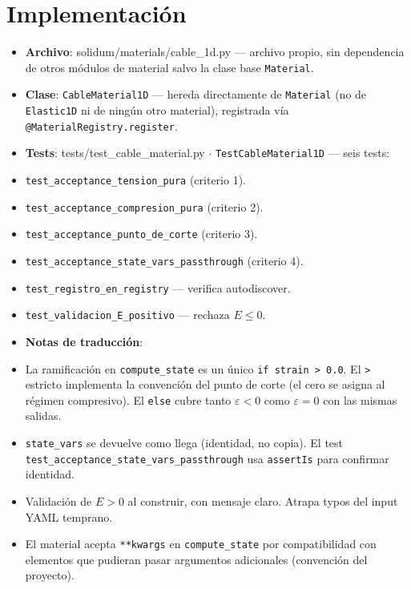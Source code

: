 \documentclass[11pt,letterpaper,oneside]{report}
\begin{document}
\section{Implementación}

\begin{itemize}
  \item \textbf{Archivo}: solidum/materials/cable\_1d.py --- archivo propio, sin dependencia de otros módulos de material salvo la clase base \texttt{Material}.
  \item \textbf{Clase}: \texttt{CableMaterial1D} --- hereda directamente de \texttt{Material} (no de \texttt{Elastic1D} ni de ningún otro material), registrada vía \texttt{@MaterialRegistry.register}.
  \item \textbf{Tests}: tests/test\_cable\_material.py \ensuremath{\cdot} \texttt{TestCableMaterial1D} --- seis tests:
  \item \texttt{test\_acceptance\_tension\_pura} (criterio 1).
  \item \texttt{test\_acceptance\_compresion\_pura} (criterio 2).
  \item \texttt{test\_acceptance\_punto\_de\_corte} (criterio 3).
  \item \texttt{test\_acceptance\_state\_vars\_passthrough} (criterio 4).
  \item \texttt{test\_registro\_en\_registry} --- verifica autodiscover.
  \item \texttt{test\_validacion\_E\_positivo} --- rechaza $E \leq 0$.
  \item \textbf{Notas de traducción}:
  \item La ramificación en \texttt{compute\_state} es un único \texttt{if strain > 0.0}. El \texttt{>} estricto implementa la convención del punto de corte (el cero se asigna al régimen compresivo). El \texttt{else} cubre tanto $\varepsilon < 0$ como $\varepsilon = 0$ con las mismas salidas.
  \item \texttt{state\_vars} se devuelve como llega (identidad, no copia). El test \texttt{test\_acceptance\_state\_vars\_passthrough} usa \texttt{assertIs} para confirmar identidad.
  \item Validación de $E > 0$ al construir, con mensaje claro. Atrapa typos del input YAML temprano.
  \item El material acepta \texttt{**kwargs} en \texttt{compute\_state} por compatibilidad con elementos que pudieran pasar argumentos adicionales (convención del proyecto).
\end{itemize}
\end{document}
